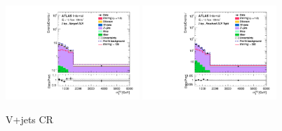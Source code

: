 \begin{figure}[H]
    \\
     \includegraphics[width=0.45\textwidth]{figures/PostFit/Region_distMTagMerJets_DCRVjet_BMin0_J0_incJet1_L2_T0_incFat1_Y6051_incTag1_Fat1_GlobalFit_unconditionnal_mu1log}
      \includegraphics[width=0.45\textwidth]{figures/PostFit/Region_distMTagResJets_DCRVjetFid_BMin0_T0_Y6051_incTag1_J2_L2_incJet1_GlobalFit_unconditionnal_mu1log}
    \caption{V+jets CR}
    \label{fig:postCR}
\end{figure}

